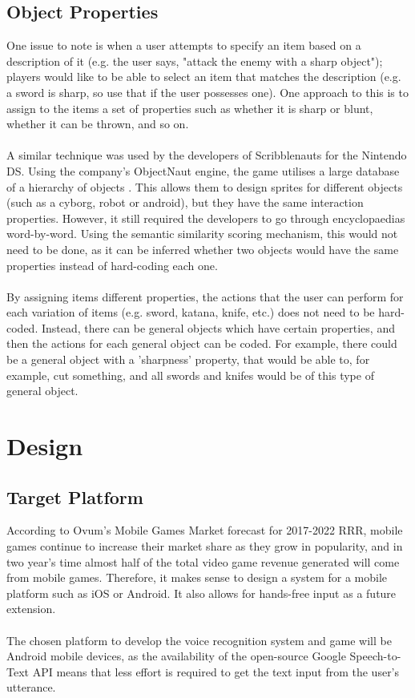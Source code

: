 \documentclass[11pt]{article}
\begin{document}
\subsection{Object Properties}

One issue to note is when a user attempts to specify an item based on a description of it (e.g. the user says, "attack the enemy with a sharp object"); players would like to be able to select an item that matches the description (e.g. a sword is sharp, so use that if the user possesses one). One approach to this is to assign to the items a set of properties such as whether it is sharp or blunt, whether it can be thrown, and so on.
\\
\\
A similar technique was used by the developers of Scribblenauts for the Nintendo DS. Using the company's ObjectNaut engine, the game utilises a large database of a hierarchy of objects \cite{RefWorks:48}. This allows them to design sprites for different objects (such as a cyborg, robot or android), but they have the same interaction properties. However, it still required the developers to go through encyclopaedias word-by-word. Using the semantic similarity scoring mechanism, this would not need to be done, as it can be inferred whether two objects would have the same properties instead of hard-coding each one.
\\
\\
By assigning items different properties, the actions that the user can perform for each variation of items (e.g. sword, katana, knife, etc.) does not need to be hard-coded. Instead, there can be general objects which have certain properties, and then the actions for each general object can be coded. For example, there could be a general object with a 'sharpness' property, that would be able to, for example, cut something, and all swords and knifes would be of this type of general object.
\newpage

\section{Design}
\subsection{Target Platform}

According to Ovum's Mobile Games Market forecast for 2017-2022 RRR, mobile games continue to increase their market share as they grow in popularity, and in two year's time almost half of the total video game revenue generated will come from mobile games. Therefore, it makes sense to design a system for a mobile platform such as iOS or Android.  It also allows for hands-free input as a future extension.
\\
\\
The chosen platform to develop the voice recognition system and game will be Android mobile devices, as the availability of the open-source Google Speech-to-Text API means that less effort is required to get the text input from the user's utterance.
\end{document}
